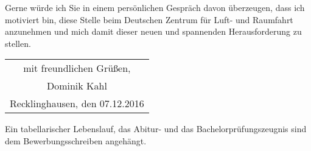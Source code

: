 \documentclass[12pt]{scrartcl}
\begin{document}
Gerne würde ich Sie in einem persönlichen Gespräch davon überzeugen, dass ich 
motiviert bin, diese Stelle beim Deutschen Zentrum für Luft- und Raumfahrt 
anzunehmen und mich damit dieser neuen und spannenden Herausforderung zu 
stellen.
\\[0.2cm]

\begin{flushright}
\begin{tabular}{c}
mit freundlichen Grüßen, 		\\[0.3cm]
Dominik Kahl 					\\[0.3cm]
Recklinghausen, den 07.12.2016 	\\[0.6cm]
\end{tabular}
\end{flushright}

Ein tabellarischer Lebenslauf, das Abitur- und das Bachelorprüfungszeugnis 
sind dem Bewerbungsschreiben angehängt.
\end{document}
